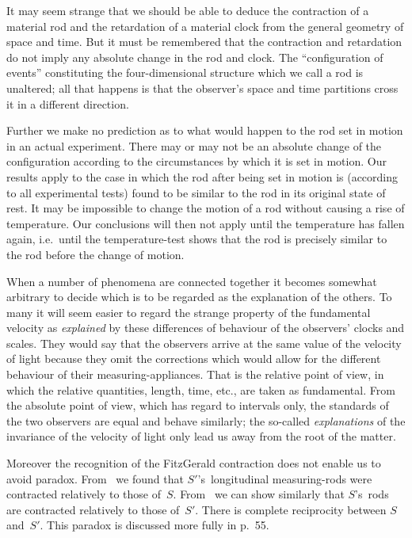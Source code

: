 \documentclass[12pt]{book}
\begin{document}
It may seem strange that we should be able to deduce the contraction of
a material rod and the retardation of a material clock from the general
geometry of space and time. But it must be remembered that the contraction
and retardation do not imply any absolute change in the rod and clock. The
``configuration of events'' constituting the four\hyp{}dimensional structure which
we call a rod is unaltered; all that happens is that the observer's space and
time partitions cross it in a different direction.

Further we make no prediction as to what would happen to the rod set
in motion in an actual experiment. There may or may not be an absolute
change of the configuration according to the circumstances by which it is set
in motion. Our results apply to the case in which the rod after being set in
motion is (according to all experimental tests) found to be similar to the rod
in its original state of rest\footnotemark.\footnotetext
  {It may be impossible to change the motion of a rod without causing a rise of temperature.
  Our conclusions will then not apply until the temperature has fallen again, i.e.\ until the temperature\hyp{}test
  shows that the rod is precisely similar to the rod before the change of motion.}

When a number of phenomena are connected together it becomes somewhat
arbitrary to decide which is to be regarded as the explanation of the
others. To many it will seem easier to regard the strange property of
the fundamental velocity as \emph{explained} by these differences of behaviour of
the observers' clocks and scales. They would say that the observers arrive
at the same value of the velocity of light because they omit the corrections
which would allow for the different behaviour of their measuring\hyp{}appliances.
That is the relative point of view, in which the relative quantities, length,
time, etc., are taken as fundamental. From the absolute point of view, which
has regard to intervals only, the standards of the two observers are equal and
behave similarly; the so-called \emph{explanations} of the invariance of the velocity
of light only lead us away from the root of the matter.

Moreover the recognition of the FitzGerald contraction does not enable
us to avoid paradox. From~ we found that $S'$'s~longitudinal measuring\hyp{}rods
were contracted relatively to those of~$S$. From~ we can show similarly
that $S$'s~rods are contracted relatively to those of~$S'$. There is complete
reciprocity between $S$ and~$S'$. This paradox is discussed more fully in
 p.~55.
\end{document}
